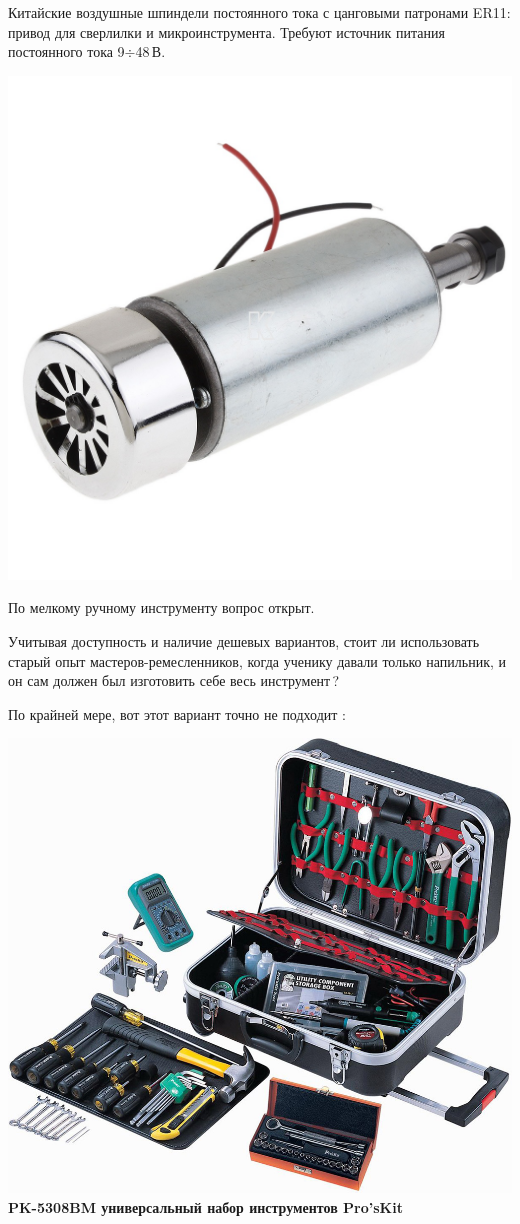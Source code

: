 \documentclass{magazine}
\begin{document}
{\bigskip
Китайские воздушные шпиндели постоянного тока с цанговыми патронами ER11:
привод для сверлилки и микроинструмента. Требуют источник питания
постоянного тока 9$\div$48\,В.

\noindent\includegraphics[width=\columnwidth]{fig/00/ER11.jpg}


По мелкому ручному инструменту вопрос открыт.

Учитывая доступность и наличие дешевых вариантов, стоит ли использовать старый
опыт мастеров-ремесленников, когда ученику давали только напильник, и он сам
должен был изготовить себе весь инструмент\,?

По крайней мере, вот этот вариант точно не подходит \smiley:

\noindent\includegraphics[width=\columnwidth]{fig/00/PK5308BM.jpg}
\textbf{PK-5308BM универсальный набор инструментов Pro'sKit}

}
\end{document}
